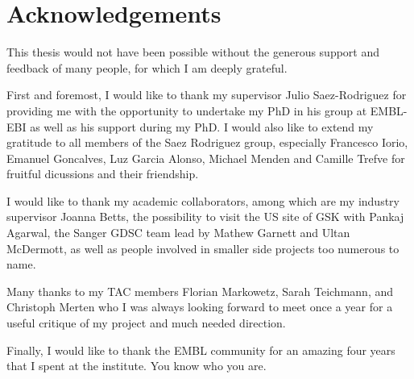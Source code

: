 \chapter*{Acknowledgements}

This thesis would not have been possible without the generous support and
feedback of many people, for which I am deeply grateful.

First and foremost, I would like to thank my supervisor Julio Saez-Rodriguez
for providing me with the opportunity to undertake my PhD in his group at
EMBL-EBI as well as his support during my PhD. I would also like to extend my
gratitude to all members of the Saez Rodriguez group, especially Francesco
Iorio, Emanuel Goncalves, Luz Garcia Alonso, Michael Menden and Camille Trefve
for fruitful dicussions and their friendship.

I would like to thank my academic collaborators, among which are my industry
supervisor Joanna Betts, the possibility to visit the US site of GSK with
Pankaj Agarwal, the Sanger GDSC team lead by Mathew Garnett and Ultan
McDermott, as well as people involved in smaller side projects too numerous to
name.

Many thanks to my TAC members Florian Markowetz, Sarah Teichmann, and Christoph
Merten who I was always looking forward to meet once a year for a useful
critique of my project and much needed direction.

Finally, I would like to thank the EMBL community for an amazing four years
that I spent at the institute. You know who you are.
